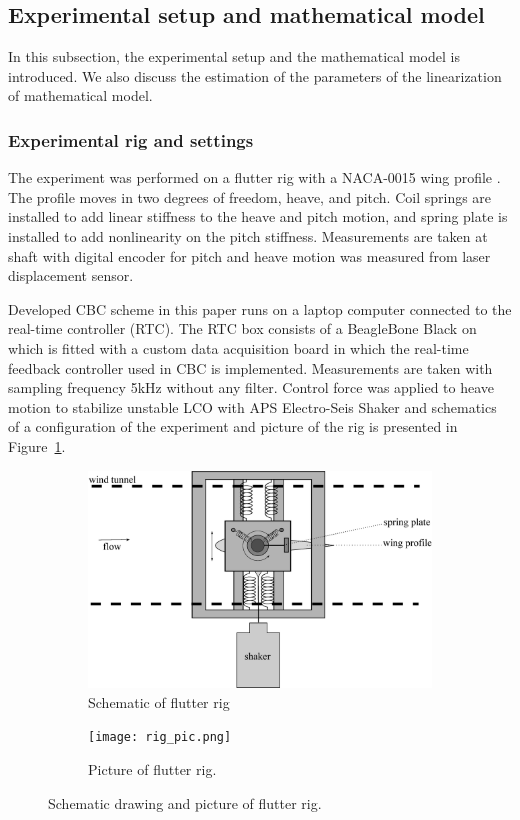\documentclass[openacc]{rsproca_new}%
\newcommand{\Fref}[1]{Figure~\ref{#1}}
\begin{document}
\subsection{Experimental setup and mathematical model}\label{model}
In this subsection, the experimental setup and the mathematical model is introduced. We also discuss the estimation of the parameters of the linearization of mathematical model.
\subsubsection{Experimental rig and settings}\label{setup}
The experiment was performed on a flutter rig with a NACA-0015 wing profile \cite{jacobs1933characteristics}. The profile moves in two degrees of freedom, heave, and pitch. Coil springs are installed to add linear stiffness to the heave and pitch motion, and spring plate is installed to add nonlinearity on the pitch stiffness. Measurements are taken at shaft with digital encoder for pitch and heave motion was measured from laser displacement sensor.

Developed CBC scheme in this paper runs on a laptop computer connected to the real-time controller (RTC). The RTC box consists of a BeagleBone Black on which is fitted with a custom data acquisition board in which the real-time feedback controller used in CBC is implemented. Measurements are taken with sampling frequency  5kHz without any filter.  Control force was applied to heave motion to stabilize unstable LCO with APS Electro-Seis Shaker and schematics of a configuration of the experiment and picture of the rig is presented in \Fref{f:rig}.

\begin{figure}
  \centering
  \begin{subfigure}[b]{0.6\linewidth}
    \includegraphics[width=\linewidth]{flutter_rig.eps}
    \caption{Schematic of flutter rig}
  \end{subfigure}
  \begin{subfigure}[b]{0.6\linewidth}
    \texttt{[image: rig\_pic.png]}
    \caption{Picture of flutter rig.}
  \end{subfigure}
  \caption{Schematic drawing and picture of flutter rig.}
  \label{f:rig}
\end{figure}
\end{document}
